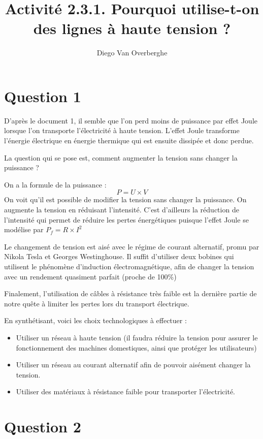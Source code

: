 \documentclass{scrartcl}
\title{Activité 2.3.1. Pourquoi utilise-t-on des lignes à haute tension ?}
\author{Diego Van Overberghe}
\begin{document}
    \maketitle

    \section*{Question 1}

    D'après le document 1, il semble que l'on perd moins de puissance par effet Joule lorsque l'on transporte l'électricité à haute tension. L'effet Joule transforme l'énergie électrique en énergie thermique qui est ensuite dissipée et donc perdue.

    La question qui se pose est, comment augmenter la tension sans changer la puissance ?

    On a la formule de la puissance : \[P=U\times V\]
    On voit qu'il est possible de modifier la tension sans changer la puissance. On augmente la tension en réduisant l'intensité. C'est d'ailleurs la réduction de l'intensité qui permet de réduire les pertes énergétiques puisque l'effet Joule se modélise par $P_{f}=R\times I^2$

    Le changement de tension est aisé avec le régime de courant alternatif, promu par Nikola Tesla et Georges Westinghouse. Il suffit d'utiliser deux bobines qui utilisent le phénomène d'induction électromagnétique, afin de changer la tension avec un rendement quasiment parfait (proche de 100\%)

    Finalement, l'utilisation de câbles à résistance très faible est la dernière partie de notre quête à limiter les pertes lors du transport électrique.

    En synthétisant, voici les choix technologiques à effectuer :
    \begin{itemize}
        \item Utiliser un réseau à haute tension (il faudra réduire la tension pour assurer le fonctionnement des machines domestiques, ainsi que protéger les utilisateurs)
        \item Utiliser un réseau au courant alternatif afin de pouvoir aisément changer la tension.
        \item Utiliser des matériaux à résistance faible pour transporter l'électricité.
    \end{itemize}

    \section*{Question 2}
\end{document}
